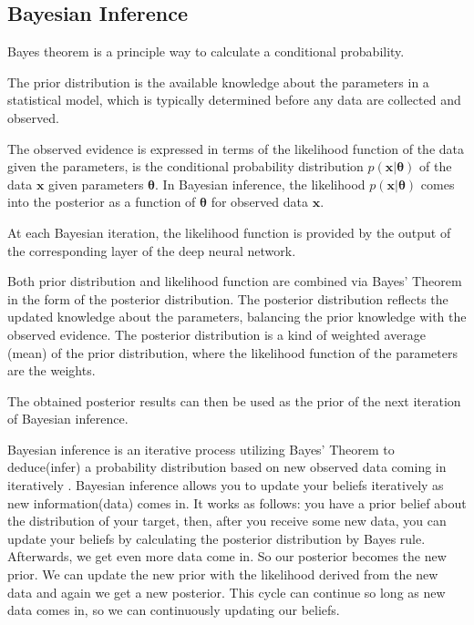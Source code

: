 \documentclass{article}
\begin{document}
\subsection{Bayesian Inference}

Bayes theorem is a principle way to calculate a conditional probability.

The prior distribution is the available knowledge about the parameters in a statistical model, which is typically determined before any data are collected and observed. 

The observed evidence is expressed in terms of the likelihood function of the data given the parameters, is the conditional probability distribution $p(\bm{x}|\bm{\theta})$ of  the data $\bm{x}$ given parameters $\bm{\theta}$. 
In Bayesian inference, the likelihood $p(\bm{x}|\bm{\theta})$ comes into the posterior as a function of $\bm{\theta}$ for observed data $\bm{x}$. \citep{van2021bayesian}

At each Bayesian iteration, the likelihood function is provided by the output of the corresponding layer of the deep neural network.

Both prior distribution and likelihood function are combined via Bayes' Theorem in the form of the posterior distribution. The posterior distribution reflects the updated knowledge about the parameters, balancing the prior knowledge with the observed evidence.
The posterior distribution is a kind of weighted average (mean) of the prior distribution, where the likelihood function of the parameters are the weights. 

The obtained posterior results can then be used as the prior of the next iteration of Bayesian inference.

Bayesian inference is an iterative process utilizing Bayes' Theorem to deduce(infer) a probability distribution based on new observed data coming in iteratively \citep{harper2009replicator}.
Bayesian inference allows you to update your beliefs iteratively as new information(data) comes in. It works as follows: you have a prior belief about the distribution of your target, then, after you receive some new data, you can update your beliefs by calculating the posterior distribution by Bayes rule. Afterwards, we get even more data come in. So our posterior becomes the new prior. We can update the new prior with the likelihood derived from the new data and again we get a new posterior. This cycle can continue so long as new data comes in, so we can continuously updating our beliefs.
\end{document}
